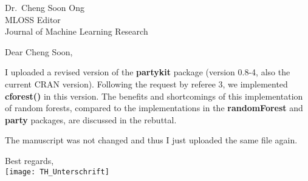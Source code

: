 \documentclass[ngerman,uzh]{scrlttr2}
\begin{document}

\begin{letter}{
Dr.~Cheng Soon Ong \\
MLOSS Editor \\
Journal of Machine Learning Research}

\subject{JMLR-14-133-4 revision}

\opening{Dear Cheng Soon,}

I uploaded a revised version of the \textbf{partykit} package (version
0.8-4, also the current CRAN version). Following the request by referee 3,
we implemented \textbf{cforest()} in this version. The benefits and
shortcomings of this implementation of random forests, compared to the
implementations in the \textbf{randomForest} and \textbf{party} packages, are
discussed in the rebuttal.

The manuscript was not changed and thus I just uploaded the same file again.

Best regards, \\
\texttt{[image: TH\_Unterschrift]}

\end{letter}
\end{document}

